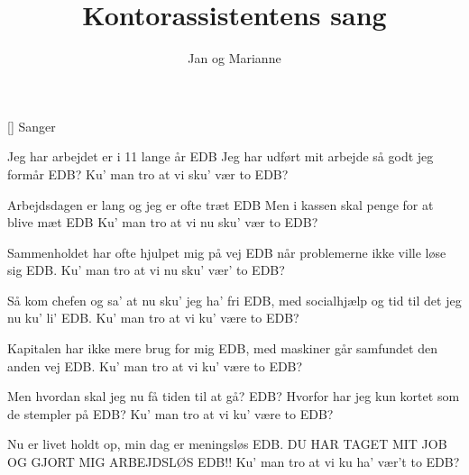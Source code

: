 \documentclass[a4paper,11pt]{article}
\title{Kontorassistentens sang}
\author{Jan og Marianne}
\begin{document}
\maketitle

\begin{roles}
[] Sanger
\end{roles}

\begin{song}
  Jeg har arbejdet er i 11 lange år
  EDB
  Jeg har udført mit arbejde så godt jeg formår
  EDB?
  Ku' man tro at vi sku' vær to
  EDB?

  Arbejdsdagen er lang og jeg er ofte træt
  EDB
  Men i kassen skal penge for at blive mæt
  EDB
  Ku' man tro at vi nu sku' vær to
  EDB?

  Sammenholdet har ofte hjulpet mig på vej
  EDB
  når problemerne ikke ville løse sig
  EDB.
  Ku' man tro at vi nu sku' vær' to
  EDB?

  Så kom chefen og sa' at nu sku' jeg ha' fri
  EDB,
  med socialhjælp og tid til det jeg nu ku' li'
  EDB.
  Ku' man tro at vi ku' være to
  EDB?

  Kapitalen har ikke mere brug for mig
  EDB,
  med maskiner går samfundet den anden vej
  EDB.
  Ku' man tro at vi ku' være to
  EDB?

  Men hvordan skal jeg nu få tiden til at gå?
  EDB?
  Hvorfor har jeg kun kortet som de stempler på
  EDB?
  Ku' man tro at vi ku' være to
  EDB?

  Nu er livet holdt op, min dag er meningsløs
  EDB.
  DU HAR TAGET MIT JOB OG GJORT MIG ARBEJDSLØS
  EDB!!
  Ku' man tro at vi ku ha' vær't to
  EDB?
\end{song}
\end{document}
